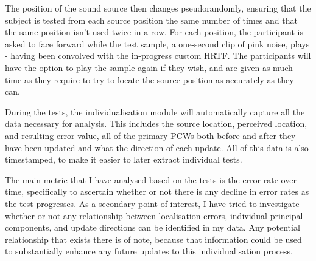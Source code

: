 The position of the sound source then changes pseudorandomly, ensuring that the subject is tested from each source position the same number of times and that the same position isn't used twice in a row. For each position, the participant is asked to face forward while the test sample, a one-second clip of pink noise, plays - having been convolved with the in-progress custom HRTF. The participants will have the option to play the sample again if they wish, and are given as much time as they require to try to locate the source position as accurately as they can.

During the tests, the individualisation module will automatically capture all the data necessary for analysis. This includes the source location, perceived location, and resulting error value, all of the primary PCWs both before and after they have been updated and what the direction of each update. All of this data is also timestamped, to make it easier to later extract individual tests.

The main metric that I have analysed based on the tests is the error rate over time, specifically to ascertain whether or not there is any decline in error rates as the test progresses. As a secondary point of interest, I have tried to investigate whether or not any relationship between localisation errors, individual principal components, and update directions can be identified in my data. Any potential relationship that exists there is of note, because that information could be used to substantially enhance any future updates to this individualisation process.